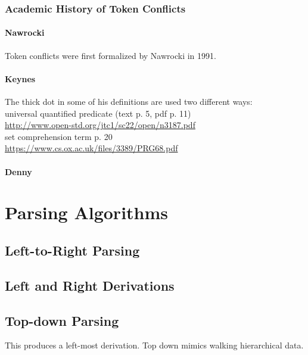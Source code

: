 \documentclass{book}
\begin{document}
\subsection{Academic History of Token Conflicts}

\subsubsection{Nawrocki}
Token conflicts were first formalized by Nawrocki in 1991.

\subsubsection{Keynes}

The thick dot in some of his definitions are used two
different ways:\\
universal quantified predicate (text p. 5, pdf p. 11)\\
\url{http://www.open-std.org/jtc1/sc22/open/n3187.pdf}\\

set comprehension term p. 20\\
\url{https://www.cs.ox.ac.uk/files/3389/PRG68.pdf}\\

\subsubsection{Denny}




%
%
\chapter{Parsing Algorithms}

\section{Left-to-Right Parsing}

\section{Left and Right Derivations}

\section{Top-down Parsing}
This produces a left-most derivation.
Top down mimics walking hierarchical data.
\end{document}
